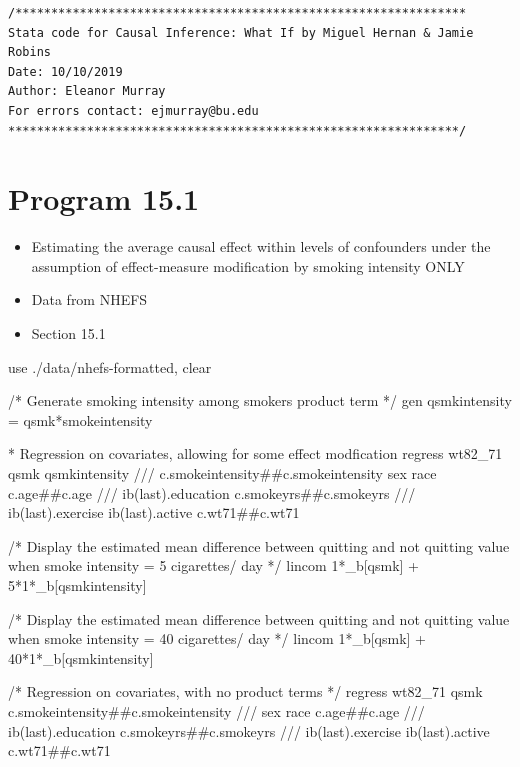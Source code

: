 \documentclass[
  10pt,
  a4paper,
]{book}
\newenvironment{Shaded}{\begin{snugshade}}{\end{snugshade}}
\newcommand{\CommentTok}[1]{\textcolor[rgb]{0.37,0.37,0.37}{#1}}
\newcommand{\FunctionTok}[1]{\textcolor[rgb]{0.28,0.35,0.67}{#1}}
\newcommand{\KeywordTok}[1]{\textcolor[rgb]{0.00,0.46,0.62}{#1}}
\newcommand{\NormalTok}[1]{\textcolor[rgb]{0.00,0.46,0.62}{#1}}
\providecommand{\tightlist}{%
  \setlength{\itemsep}{0pt}\setlength{\parskip}{0pt}}
\begin{document}
\begin{verbatim}
/***************************************************************
Stata code for Causal Inference: What If by Miguel Hernan & Jamie Robins
Date: 10/10/2019
Author: Eleanor Murray 
For errors contact: ejmurray@bu.edu
***************************************************************/
\end{verbatim}

\section{Program 15.1}\label{program-15.1-1}

\begin{itemize}
\tightlist
\item
  Estimating the average causal effect within levels of confounders under the assumption of effect-measure modification by smoking intensity ONLY
\item
  Data from NHEFS
\item
  Section 15.1
\end{itemize}

\begin{Shaded}
\begin{Highlighting}[]
\KeywordTok{use}\NormalTok{ ./}\KeywordTok{data}\NormalTok{/nhefs{-}formatted, }\KeywordTok{clear}

\CommentTok{/* Generate smoking intensity among smokers product term */}
\KeywordTok{gen}\NormalTok{ qsmkintensity = qsmk*smokeintensity}

\NormalTok{* Regression }\KeywordTok{on}\NormalTok{ covariates, allowing }\KeywordTok{for}\NormalTok{ some effect modfication}
\KeywordTok{regress}\NormalTok{ wt82\_71 qsmk qsmkintensity }\CommentTok{///}
\NormalTok{  c.smokeintensity\#\#c.smokeintensity sex race c.age\#\#c.age }\CommentTok{///}
\NormalTok{  ib(}\FunctionTok{last}\NormalTok{).education c.smokeyrs\#\#c.smokeyrs }\CommentTok{///}
\NormalTok{  ib(}\FunctionTok{last}\NormalTok{).exercise ib(}\FunctionTok{last}\NormalTok{).active c.wt71\#\#c.wt71 }

\CommentTok{/* Display the estimated mean difference between quitting and }
\CommentTok{  not quitting value when smoke intensity = 5 cigarettes/ day */}
\KeywordTok{lincom}\NormalTok{ 1*\_b[qsmk] + 5*1*\_b[qsmkintensity] }

\CommentTok{/* Display the estimated mean difference between quitting and }
\CommentTok{  not quitting value when smoke intensity = 40 cigarettes/ day */}
\KeywordTok{lincom}\NormalTok{ 1*\_b[qsmk] + 40*1*\_b[qsmkintensity]}

\CommentTok{/* Regression on covariates, with no product terms */}
\KeywordTok{regress}\NormalTok{ wt82\_71 qsmk c.smokeintensity\#\#c.smokeintensity }\CommentTok{///}
\NormalTok{  sex race c.age\#\#c.age }\CommentTok{///}
\NormalTok{  ib(}\FunctionTok{last}\NormalTok{).education c.smokeyrs\#\#c.smokeyrs }\CommentTok{///}
\NormalTok{  ib(}\FunctionTok{last}\NormalTok{).exercise ib(}\FunctionTok{last}\NormalTok{).active c.wt71\#\#c.wt71 }
\end{Highlighting}
\end{Shaded}
\end{document}
